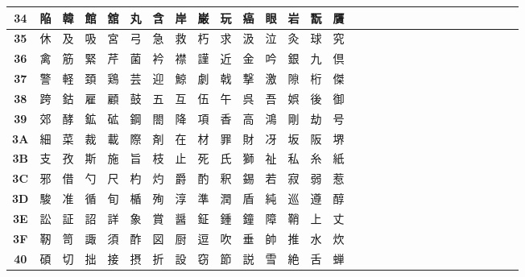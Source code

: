 \begin{table}[H]
\begin{tabular}{|Sc|Sc|Sc|Sc|Sc|Sc|Sc|Sc|Sc|Sc|Sc|Sc|Sc|Sc|Sc|}
\textbf{34} & 陥 & 韓 & 館 & 舘 & 丸 & 含 & 岸 & 巌 & 玩 & 癌 & 眼 & 岩 & 翫 & 贋 \\ \hline
\textbf{35} & 休 & 及 & 吸 & 宮 & 弓 & 急 & 救 & 朽 & 求 & 汲 & 泣 & 灸 & 球 & 究 \\ \hline
\textbf{36} & 禽 & 筋 & 緊 & 芹 & 菌 & 衿 & 襟 & 謹 & 近 & 金 & 吟 & 銀 & 九 & 倶 \\ \hline
\textbf{37} & 警 & 軽 & 頚 & 鶏 & 芸 & 迎 & 鯨 & 劇 & 戟 & 撃 & 激 & 隙 & 桁 & 傑 \\ \hline
\textbf{38} & 跨 & 鈷 & 雇 & 顧 & 鼓 & 五 & 互 & 伍 & 午 & 呉 & 吾 & 娯 & 後 & 御 \\ \hline
\textbf{39} & 郊 & 酵 & 鉱 & 砿 & 鋼 & 閤 & 降 & 項 & 香 & 高 & 鴻 & 剛 & 劫 & 号 \\ \hline
\textbf{3A} & 細 & 菜 & 裁 & 載 & 際 & 剤 & 在 & 材 & 罪 & 財 & 冴 & 坂 & 阪 & 堺 \\ \hline
\textbf{3B} & 支 & 孜 & 斯 & 施 & 旨 & 枝 & 止 & 死 & 氏 & 獅 & 祉 & 私 & 糸 & 紙 \\ \hline
\textbf{3C} & 邪 & 借 & 勺 & 尺 & 杓 & 灼 & 爵 & 酌 & 釈 & 錫 & 若 & 寂 & 弱 & 惹 \\ \hline
\textbf{3D} & 駿 & 准 & 循 & 旬 & 楯 & 殉 & 淳 & 準 & 潤 & 盾 & 純 & 巡 & 遵 & 醇 \\ \hline
\textbf{3E} & 訟 & 証 & 詔 & 詳 & 象 & 賞 & 醤 & 鉦 & 鍾 & 鐘 & 障 & 鞘 & 上 & 丈 \\ \hline
\textbf{3F} & 靭 & 笥 & 諏 & 須 & 酢 & 図 & 厨 & 逗 & 吹 & 垂 & 帥 & 推 & 水 & 炊 \\ \hline
\textbf{40} & 碩 & 切 & 拙 & 接 & 摂 & 折 & 設 & 窃 & 節 & 説 & 雪 & 絶 & 舌 & 蝉 \\ \hline
\end{tabular}
\end{table}

